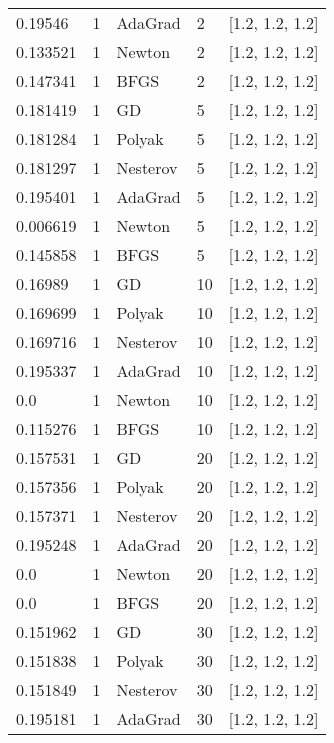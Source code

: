 \begin{tabular}{lllll}
   0.19546 &        1 &  AdaGrad &      2 &  [1.2, 1.2, 1.2] \\
  0.133521 &        1 &   Newton &      2 &  [1.2, 1.2, 1.2] \\
  0.147341 &        1 &     BFGS &      2 &  [1.2, 1.2, 1.2] \\
  0.181419 &        1 &       GD &      5 &  [1.2, 1.2, 1.2] \\
  0.181284 &        1 &   Polyak &      5 &  [1.2, 1.2, 1.2] \\
  0.181297 &        1 & Nesterov &      5 &  [1.2, 1.2, 1.2] \\
  0.195401 &        1 &  AdaGrad &      5 &  [1.2, 1.2, 1.2] \\
  0.006619 &        1 &   Newton &      5 &  [1.2, 1.2, 1.2] \\
  0.145858 &        1 &     BFGS &      5 &  [1.2, 1.2, 1.2] \\
   0.16989 &        1 &       GD &     10 &  [1.2, 1.2, 1.2] \\
  0.169699 &        1 &   Polyak &     10 &  [1.2, 1.2, 1.2] \\
  0.169716 &        1 & Nesterov &     10 &  [1.2, 1.2, 1.2] \\
  0.195337 &        1 &  AdaGrad &     10 &  [1.2, 1.2, 1.2] \\
       0.0 &        1 &   Newton &     10 &  [1.2, 1.2, 1.2] \\
  0.115276 &        1 &     BFGS &     10 &  [1.2, 1.2, 1.2] \\
  0.157531 &        1 &       GD &     20 &  [1.2, 1.2, 1.2] \\
  0.157356 &        1 &   Polyak &     20 &  [1.2, 1.2, 1.2] \\
  0.157371 &        1 & Nesterov &     20 &  [1.2, 1.2, 1.2] \\
  0.195248 &        1 &  AdaGrad &     20 &  [1.2, 1.2, 1.2] \\
       0.0 &        1 &   Newton &     20 &  [1.2, 1.2, 1.2] \\
       0.0 &        1 &     BFGS &     20 &  [1.2, 1.2, 1.2] \\
  0.151962 &        1 &       GD &     30 &  [1.2, 1.2, 1.2] \\
  0.151838 &        1 &   Polyak &     30 &  [1.2, 1.2, 1.2] \\
  0.151849 &        1 & Nesterov &     30 &  [1.2, 1.2, 1.2] \\
  0.195181 &        1 &  AdaGrad &     30 &  [1.2, 1.2, 1.2] \\

\end{tabular}
